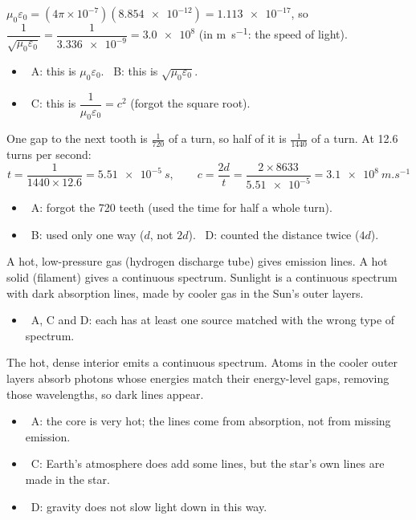 \documentclass[12pt]{article}
\begin{document}
\begin{practiceanswers}
\begin{practiceans}
  $\mu_0\varepsilon_0 = (4\pi\times10^{-7})(\num{8.854e-12}) = \num{1.113e-17}$, so
  $\dfrac{1}{\sqrt{\mu_0\varepsilon_0}} = \dfrac{1}{\num{3.336e-9}} = \num{3.0e8}$ (in \si{m.s^{-1}}:
  the speed of light).
  \begin{itemize}
    \item \xmark\ A: this is $\mu_0\varepsilon_0$. \quad \xmark\ B: this is $\sqrt{\mu_0\varepsilon_0}$.
    \item \xmark\ C: this is $\dfrac{1}{\mu_0\varepsilon_0} = c^2$ (forgot the square root).
  \end{itemize}
\end{practiceans}

\begin{practiceans}
  One gap to the next tooth is $\frac{1}{720}$ of a turn, so half of it is $\frac{1}{1440}$ of a turn.
  At 12.6 turns per second:
  \[ t = \frac{1}{1440 \times 12.6} = \qty{5.51e-5}{s}, \qquad
     c = \frac{2d}{t} = \frac{2 \times 8633}{\num{5.51e-5}} = \qty{3.1e8}{m.s^{-1}} \]
  \begin{itemize}
    \item \xmark\ A: forgot the 720 teeth (used the time for half a whole turn).
    \item \xmark\ B: used only one way ($d$, not $2d$). \quad \xmark\ D: counted the distance twice
          ($4d$).
  \end{itemize}
\end{practiceans}

\begin{practiceans}
  A hot, low-pressure gas (hydrogen discharge tube) gives emission lines. A hot solid (filament) gives
  a continuous spectrum. Sunlight is a continuous spectrum with dark absorption lines, made by cooler
  gas in the Sun's outer layers.
  \begin{itemize}
    \item \xmark\ A, C and D: each has at least one source matched with the wrong type of spectrum.
  \end{itemize}
\end{practiceans}

\begin{practiceans}
  The hot, dense interior emits a continuous spectrum. Atoms in the cooler outer layers absorb photons
  whose energies match their energy-level gaps, removing those wavelengths, so dark lines appear.
  \begin{itemize}
    \item \xmark\ A: the core is very hot; the lines come from absorption, not from missing emission.
    \item \xmark\ C: Earth's atmosphere does add some lines, but the star's own lines are made in the
          star.
    \item \xmark\ D: gravity does not slow light down in this way.
  \end{itemize}
\end{practiceans}


\end{practiceanswers}
\end{document}

